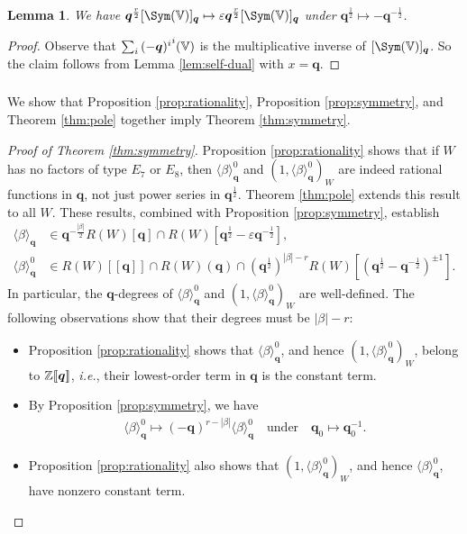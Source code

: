 \documentclass[a4paper,10pt,leqno]{amsart}
\theoremstyle{plain}
\theoremstyle{plain}
\theoremstyle{plain}
\newtheorem{lem}[thm]{Lemma}
\theoremstyle{definition}
\theoremstyle{remark}
\let\Alt\relax
\DeclareMathOperator{\Alt}{\text{$\Lambda$}}
\newcommand{\Q}{\bm{q}}
\newcommand{\Tr}[1]{\langle{#1}\rangle_{\Q}}
\begin{document}
\begin{lem}
We have $\Q^{\frac{r}{2}} [\Sym(\bb{V})]_{\Q} \mapsto \varepsilon \Q^{\frac{r}{2}} [\Sym(\bb{V})]_{\Q}$ under $\Q^{\frac{1}{2}} \mapsto -\Q^{-\frac{1}{2}}$.
\end{lem}

\begin{proof}
Observe that $\sum_i {(-\Q)^i} \Alt^i(\bb{V})$ is the multiplicative inverse of $[\Sym(\bb{V})]_{\Q}$.
So the claim follows from Lemma \ref{lem:self-dual} with $x = \Q$.
\end{proof}

\subsubsection{}

We show that Proposition \ref{prop:rationality}, Proposition \ref{prop:symmetry}, and Theorem \ref{thm:pole} together imply Theorem \ref{thm:symmetry}.

\begin{proof}[Proof of Theorem \ref{thm:symmetry}]
Proposition \ref{prop:rationality} shows that if $W$ has no factors of type $E_7$ or $E_8$, then $\Tr{\beta}^0$ and $(1, \Tr{\beta}^0)_W$ are indeed rational functions in $\Q$, not just power series in $\Q^{\frac{1}{2}}$.
Theorem \ref{thm:pole} extends this result to all $W$.
These results, combined with Proposition \ref{prop:symmetry}, establish
\begin{align}
\Tr{\beta} 
&\in \Q^{-\frac{|\beta|}{2}}R(W)[\Q] \cap R(W)[\Q^{\frac{1}{2}} - \varepsilon \Q^{-\frac{1}{2}}],\\
\Tr{\beta}^0
&\in 
	R(W)[\![\Q]\!] \cap R(W)(\Q) \cap
	(\Q^{\frac{1}{2}})^{|\beta| - r}
	R(W)[(\Q^{\frac{1}{2}} - \Q^{-\frac{1}{2}})^{\pm 1}].
\end{align}
In particular, the $\Q$-degrees of $\Tr{\beta}^0$ and $(1, \Tr{\beta}^0)_W$ are well-defined.
The following observations show that their degrees must be $|\beta| - r$:
\begin{itemize}
\item 	Proposition \ref{prop:rationality} shows that $\Tr{\beta}^0$, and hence $(1, \Tr{\beta}^0)_W$, belong to $\bb{Z}[\![\Q]\!]$, \emph{i.e.}, their lowest-order term in $\Q$ is the constant term.
\item 	By Proposition \ref{prop:symmetry}, we have
\begin{align}
\Tr{\beta}^0 \mapsto (-\Q)^{r - |\beta|}\Tr{\beta}^0
\quad\text{under}\quad
\Q_0 \mapsto \Q_0^{-1}.
\end{align}
\item 	Proposition \ref{prop:rationality} also shows that $(1, \Tr{\beta}^0)_W$, and hence $\Tr{\beta}^0$, have nonzero constant term.\qedhere
\end{itemize}
\end{proof}
\end{document}
